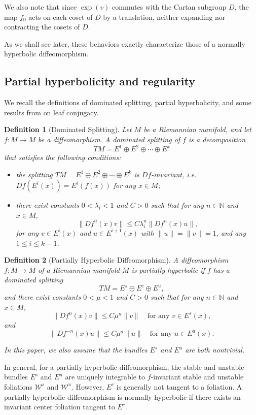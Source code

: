 \documentclass[11pt]{amsart}
\numberwithin{equation}{section}
\newcommand{\N}{\mathbb{N}}
\newcommand{\W}{\mathcal{W}}
\theoremstyle{plain}
\newtheorem{defi}{Definition}[section]
\begin{document}
We also note that since $\exp(v)$ commutes with the Cartan subgroup $D$, the map $f_0$ acts on each coset of $D$ by a translation, neither expanding nor contracting the cosets of $D$.

As we shall see later, these behaviors exactly characterize those of a normally hyperbolic diffeomorphism.

\subsection{Partial hyperbolicity and regularity}\label{prel:ph}
We recall the definitions of dominated splitting, partial hyperbolicity, and some results from \cite{HPS} on leaf conjugacy.

\begin{defi}[Dominated Splitting]
Let $M$ be a Riemannian manifold, and let $f:M\to M$ be a diffeomorphism. A \emph{dominated splitting} of $f$ is a decomposition
\[
TM=E^1\oplus E^2\oplus \cdots \oplus E^k
\]
that satisfies the following conditions:
\begin{itemize}

\item the splitting $TM=E^1\oplus E^2\oplus \cdots \oplus E^k$ is $Df$-invariant, i.e.\ $Df(E^i(x))=E^i(f(x))$ for any $x\in M$;

\item there exist constants $0<\lambda_i<1$ and $C>0$ such that for any $n\in \N$ and $x\in M$,
\[
\|Df^n(x)v\|\le C\lambda_i^n \|Df^n(x)u\|,
\]
for any $v\in E^i(x)$ and $u\in E^{i+1}(x)$ with $\|u\|=\|v\|=1$, and any $1\le i\le k-1$.
\end{itemize}
\end{defi}

\begin{defi}[Partially Hyperbolic Diffeomorphism]
A diffeomorphism $f:M\to M$ of a Riemannian manifold $M$ is \emph{partially hyperbolic} if $f$ has a dominated splitting
\[
TM=E^s\oplus E^c\oplus E^u,
\]
and there exist constants $0<\mu<1$ and $C>0$ such that for any $n\in \N$ and $x\in M$,
\[
\|Df^n(x)v\|\le C\mu^n\|v\| \quad \text{for any } v\in E^s(x),
\]
and
\[
\|Df^{-n}(x)u\|\le C\mu^n\|u\| \quad \text{for any } u\in E^u(x).
\]

In this paper, we also assume that the bundles $E^s$ and $E^u$ are both nontrivial.
\end{defi}

In general, for a partially hyperbolic diffeomorphism, the stable and unstable bundles $E^s$ and $E^u$ are uniquely integrable to $f$-invariant stable and unstable foliations $\W^s$ and $\W^u$. However, $E^c$ is generally not tangent to a foliation. A partially hyperbolic diffeomorphism is normally hyperbolic if there exists an invariant center foliation tangent to $E^c$.
\end{document}
